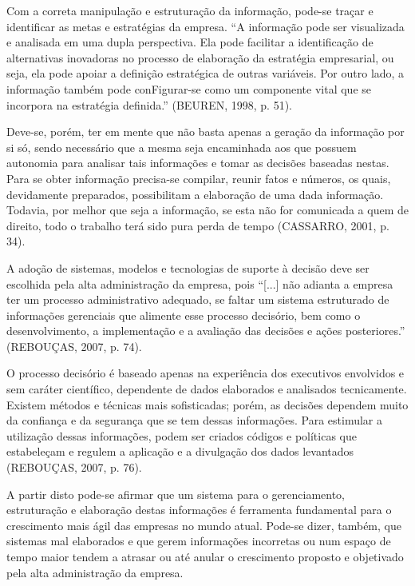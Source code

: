 \documentclass[a4paper]{article}
\begin{document}
{
\textsf{Com a correta manipula\c{c}\~ao e estrutura\c{c}\~ao da informa\c{c}\~ao, pode-se tra\c{c}ar e identificar as
metas e estrat\'egias da empresa. ``A informa\c{c}\~ao pode ser visualizada e analisada em uma dupla perspectiva. Ela
pode facilitar a identifica\c{c}\~ao de alternativas inovadoras no processo de elabora\c{c}\~ao da estrat\'egia
empresarial, ou seja, ela pode apoiar a defini\c{c}\~ao estrat\'egica de outras vari\'aveis. Por outro lado, a
informa\c{c}\~ao tamb\'em pode conFigurar-se como um componente vital que se incorpora na estrat\'egia definida.''
(BEUREN, 1998, p. 51). }}

{
\textsf{Deve-se, por\'em, ter em mente que n\~ao basta apenas a gera\c{c}\~ao da informa\c{c}\~ao por si s\'o, sendo
necess\'ario que a mesma seja encaminhada aos que possuem autonomia para analisar tais informa\c{c}\~oes e tomar as
decis\~oes baseadas nestas. Para se obter informa\c{c}\~ao precisa-se compilar, reunir fatos e n\'umeros, os quais,
devidamente preparados, possibilitam a elabora\c{c}\~ao de uma dada informa\c{c}\~ao. Todavia, por melhor que seja a
informa\c{c}\~ao, se esta n\~ao for comunicada a quem de direito, todo o trabalho ter\'a sido pura perda de tempo
(CASSARRO, 2001, p. 34). }}

{\sffamily
A ado\c{c}\~ao de sistemas, modelos e tecnologias de suporte \`a decis\~ao deve ser escolhida pela alta
administra\c{c}\~ao da empresa, pois ``[...] n\~ao adianta a empresa ter um processo administrativo adequado, se faltar
um sistema estruturado de informa\c{c}\~oes gerenciais que alimente esse processo decis\'orio, bem como o
desenvolvimento, a implementa\c{c}\~ao e a avalia\c{c}\~ao das decis\~oes e a\c{c}\~oes posteriores.'' (REBOU\c{C}AS,
2007, p. 74). }

{\sffamily
O processo decis\'orio \'e baseado apenas na experi\^encia dos executivos envolvidos e sem car\'ater cient\'ifico,
dependente de dados elaborados e analisados tecnicamente. Existem m\'etodos e t\'ecnicas mais sofisticadas; por\'em, as
decis\~oes dependem muito da confian\c{c}a e da seguran\c{c}a que se tem dessas informa\c{c}\~oes. Para estimular a
utiliza\c{c}\~ao dessas informa\c{c}\~oes, podem ser criados c\'odigos e pol\'iticas que estabele\c{c}am e regulem a
aplica\c{c}\~ao e a divulga\c{c}\~ao dos dados levantados (REBOU\c{C}AS, 2007, p. 76). }

{\sffamily
A partir disto pode-se afirmar que um sistema para o gerenciamento, estrutura\c{c}\~ao e elabora\c{c}\~ao destas
informa\c{c}\~oes \'e ferramenta fundamental para o crescimento mais \'agil das empresas no mundo atual. Pode-se dizer,
tamb\'em, que sistemas mal elaborados e que gerem informa\c{c}\~oes incorretas ou num espa\c{c}o de tempo maior tendem
a atrasar ou at\'e anular o crescimento proposto e objetivado pela alta administra\c{c}\~ao da empresa. }
\end{document}
